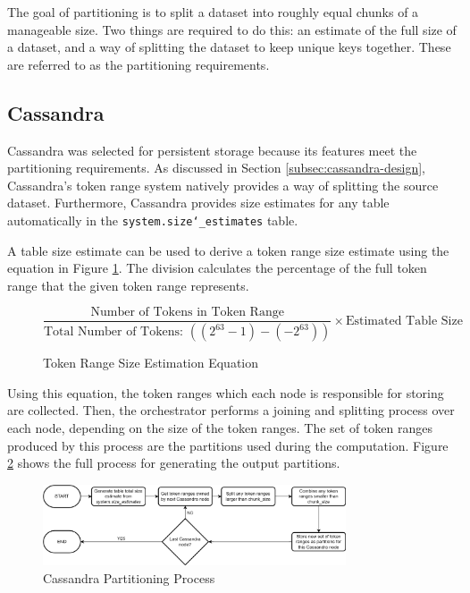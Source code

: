 The goal of partitioning is to split a dataset into roughly equal chunks of a manageable size. Two things are required to do this: an estimate of the full size of a dataset, and a way of splitting the dataset to keep unique keys together. These are referred to as the partitioning requirements.

\subsection{Cassandra}\label{subsec:cassandra}
Cassandra was selected for persistent storage because its features meet the partitioning requirements. As discussed in Section \ref{subsec:cassandra-design}, Cassandra's token range system natively provides a way of splitting the source dataset. Furthermore, Cassandra provides size estimates for any table automatically in the \texttt{system.size\char`_estimates} table.


A table size estimate can be used to derive a token range size estimate using the equation in Figure \ref{fig:token-range-estimation}. The division calculates the percentage of the full token range that the given token range represents.

\begin{figure}[h]
	\centering
	\[ \frac{\text{Number of Tokens in Token Range}}{\text{Total Number of Tokens: } ((2^{63}-1) - (-2^{63}))} \times \text{Estimated Table Size} \]
	\caption{Token Range Size Estimation Equation}
	\label{fig:token-range-estimation}
\end{figure}

Using this equation, the token ranges which each node is responsible for storing are collected. Then, the orchestrator performs a joining and splitting process over each node, depending on the size of the token ranges. The set of token ranges produced by this process are the partitions used during the computation. Figure \ref{fig:cassandra-partitioning-decision-tree} shows the full process for generating the output partitions.

\begin{figure}[h]
	\centering
	\includegraphics[width=0.8\textwidth]{chapters/diagrams/implementation/cassandra-partitioning-decision-tree}
	\caption{Cassandra Partitioning Process}
	\label{fig:cassandra-partitioning-decision-tree}
\end{figure}


